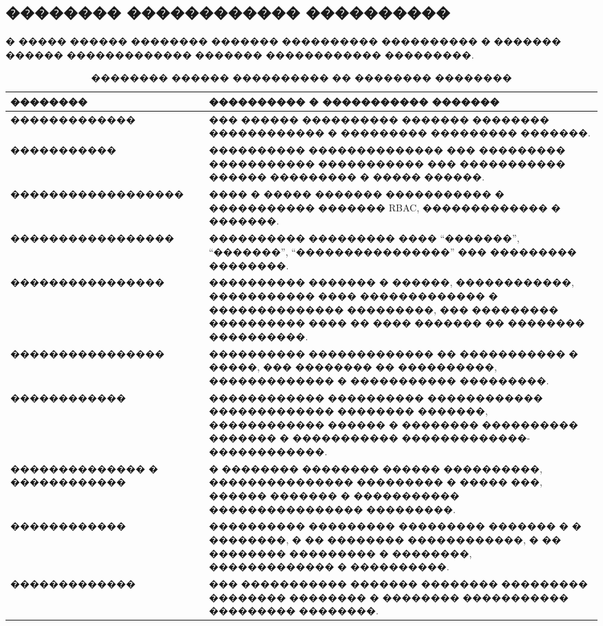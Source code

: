\subsection{�������� ������������ ����������}

� ����� ������ �������� ������� ���������� ���������� � ������� ������ ������������� ������� ������������ ���������\cite{kulikov_testing_2024}.

\begin{table}[H]
\centering
\caption{�������� ������ ���������� �� �������� ��������}
\label{tab:requirements-quality}
{\fontsize{12pt}{12pt}\selectfont
\setlength{\tabcolsep}{4pt}
\setlength{\extrarowheight}{1pt}
\renewcommand{\arraystretch}{1}
\begin{tabularx}{\textwidth}{|>{\RaggedRight\arraybackslash}p{46mm}|>{\RaggedRight\arraybackslash}X|}
\hline
�������� & ���������� � ����������� ������� \\
\hline
������������� & ��� ������ ���������� ������� �������� ������������ � ��������� ��������� �������. \\
\hline
����������� & ���������� �������������� ��� ��������� ����������� ����������� ��� ����������� ������ ��������� � ����� ������. \\
\hline
������������������ & ���� � ����� ������� ����������� � ����������� ������� RBAC, ������������� � �������. \\
\hline
����������������� & ���������� ��������� ���� ``�������'', ``�������'', ``����������������'' ��� ��������� ��������. \\
\hline
���������������� & ���������� ������� � ������, ������������, ����������� ���� ������������� � �������������� ���������, ��� ��������� ���������� ���� �� ���� ������� �� �������� ����������. \\
\hline
���������������� & ���������� ������������� �� ����������� � �����, ��� �������� �� ����������, ������������� � ����������� ���������. \\
\hline
������������ & ������������ ���������� ������������ ������������� �������� �������, ������������ ������ � �������� ���������� ������� � ����������� �������������-������������. \\
\hline
�������������� � ������������ & � �������� �������� ������ ����������, ��������������� ��������� � ����� ���, ������ ������� � ����������� ���������������� ���������. \\
\hline
������������ & ���������� ��������� ��������� ������� � � ��������, � �� �������� ������������, � �� �������� ��������� � ��������, ������������� � ����������. \\
\hline
������������� & ��� ����������� ������� �������� ��������� �������� �������� � �������� ����������� ��������� ��������. \\
\hline
\end{tabularx}
}
\end{table}

